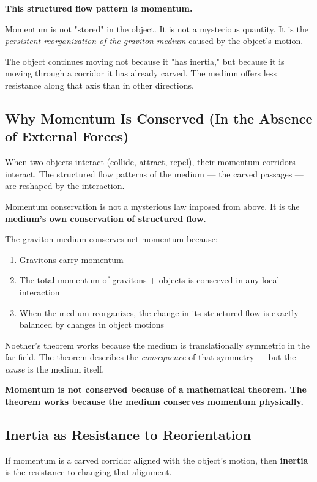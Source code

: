 \documentclass[12pt, a4paper]{article}
\begin{document}
\textbf{This structured flow pattern is momentum.}

Momentum is not "stored" in the object. It is not a mysterious quantity. It is the \textit{persistent reorganization of the graviton medium} caused by the object's motion.

The object continues moving not because it "has inertia," but because it is moving through a corridor it has already carved. The medium offers less resistance along that axis than in other directions.

\subsection{Why Momentum Is Conserved (In the Absence of External Forces)}
\label{subsec:momentum_conservation}

When two objects interact (collide, attract, repel), their momentum corridors interact. The structured flow patterns of the medium — the carved passages — are reshaped by the interaction.

Momentum conservation is not a mysterious law imposed from above. It is the \textbf{medium's own conservation of structured flow}.

The graviton medium conserves net momentum because:
\begin{enumerate}
    \item Gravitons carry momentum
    \item The total momentum of gravitons + objects is conserved in any local interaction
    \item When the medium reorganizes, the change in its structured flow is exactly balanced by changes in object motions
\end{enumerate}

Noether's theorem works because the medium is translationally symmetric in the far field. The theorem describes the \textit{consequence} of that symmetry — but the \textit{cause} is the medium itself.

\textbf{Momentum is not conserved because of a mathematical theorem. The theorem works because the medium conserves momentum physically.}

\subsection{Inertia as Resistance to Reorientation}
\label{subsec:inertia_resistance}

If momentum is a carved corridor aligned with the object's motion, then \textbf{inertia} is the resistance to changing that alignment.
\end{document}
